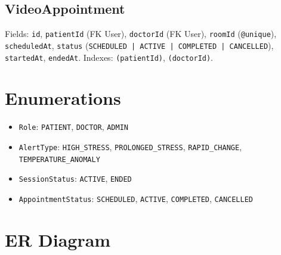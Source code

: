 \documentclass[12pt,a4paper]{report}
\begin{document}
\subsection{VideoAppointment}

Fields: \texttt{id}, \texttt{patientId} (FK User), \texttt{doctorId}
(FK User), \texttt{roomId} (\texttt{@unique}), \texttt{scheduledAt},
\texttt{status} (\texttt{SCHEDULED | ACTIVE | COMPLETED | CANCELLED}),
\texttt{startedAt}, \texttt{endedAt}. Indexes: \texttt{(patientId)},
\texttt{(doctorId)}.

\section{Enumerations}

\begin{itemize}[leftmargin=1.5em]
  \item \texttt{Role}: \texttt{PATIENT}, \texttt{DOCTOR}, \texttt{ADMIN}
  \item \texttt{AlertType}: \texttt{HIGH\_STRESS}, \texttt{PROLONGED\_STRESS},
        \texttt{RAPID\_CHANGE}, \texttt{TEMPERATURE\_ANOMALY}
  \item \texttt{SessionStatus}: \texttt{ACTIVE}, \texttt{ENDED}
  \item \texttt{AppointmentStatus}: \texttt{SCHEDULED}, \texttt{ACTIVE},
        \texttt{COMPLETED}, \texttt{CANCELLED}
\end{itemize}

\section{ER Diagram}
\end{document}

